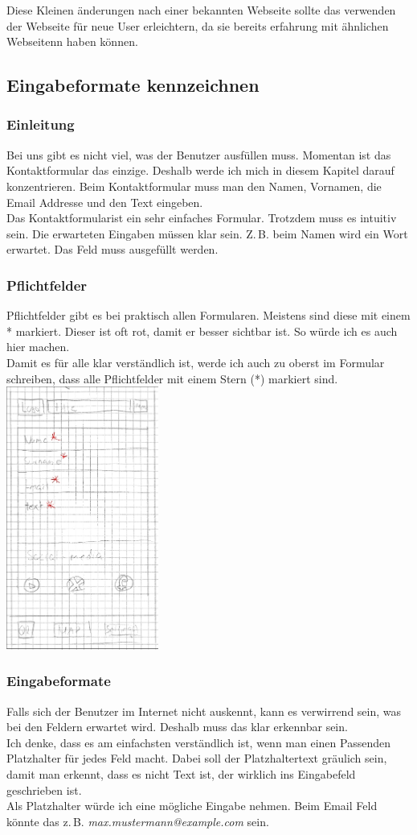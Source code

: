 \documentclass[10pt]{article}
\begin{document}
	Diese Kleinen änderungen nach einer bekannten Webseite sollte das verwenden der Webseite für neue User erleichtern, da sie bereits erfahrung mit ähnlichen Webseitenn haben können.
	
	
	\subsection{Eingabeformate kennzeichnen}
	\subsubsection{Einleitung}
	Bei uns gibt es nicht viel, was der Benutzer ausfüllen muss. Momentan ist das Kontaktformular das einzige. Deshalb werde ich mich in diesem Kapitel darauf konzentrieren. Beim Kontaktformular muss man den Namen, Vornamen, die Email Addresse und den Text eingeben.\\
	Das Kontaktformularist ein sehr einfaches Formular. Trotzdem muss es intuitiv sein. Die erwarteten Eingaben müssen klar sein. Z.\,B. beim Namen wird ein Wort erwartet. Das Feld muss ausgefüllt werden.
	\subsubsection{Pflichtfelder}
	Pflichtfelder gibt es bei praktisch allen Formularen. Meistens sind diese mit einem * markiert. Dieser ist oft rot, damit er besser sichtbar ist. So würde ich es auch hier machen.\\
	Damit es für alle klar verständlich ist, werde ich auch zu oberst im Formular schreiben, dass alle Pflichtfelder mit einem Stern (*) markiert sind.\\
	\includegraphics[width=5cm]{required-fields.jpg}
	\subsubsection{Eingabeformate}
	Falls sich der Benutzer im Internet nicht auskennt, kann es verwirrend sein, was bei den Feldern erwartet wird. Deshalb muss das klar erkennbar sein.\\
	Ich denke, dass es am einfachsten verständlich ist, wenn man einen Passenden Platzhalter für jedes Feld macht. Dabei soll der Platzhaltertext gräulich sein, damit man erkennt, dass es nicht Text ist, der wirklich ins Eingabefeld geschrieben ist.\\
	Als Platzhalter würde ich eine mögliche Eingabe nehmen. Beim Email Feld könnte das z.\,B. \textit{max.mustermann@example.com} sein.
\end{document}
